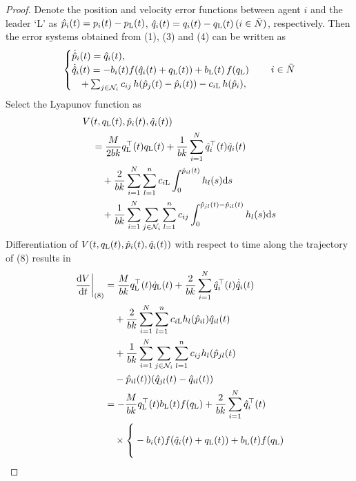 \documentclass{cta-author}
\begin{document}
\begin{proof}
Denote the position and velocity error functions
between agent $i$ and the leader `L' as
$\hat{p}_{i}(t)=p_{i}(t)-p_{\rm L}(t)$,
$\hat{q}_{i}(t)=q_{i}(t)-q_{\rm L}(t)\,(i\in\bar{N})$, respectively.
Then the error systems obtained from (1), (3) and (4) can be written as
\begin{align}
\begin{cases}
\dot{\hat{p}}_{i}(t)=\hat{q}_{i}(t),\\
\dot{\hat{q}}_{i}(t)=-b_{i}(t)f(\hat{q}_{i}(t)+q_{\rm L}(t))+b_{\rm L}(t)\,f(q_{\rm L})\\
\quad +\sum_{j\in\mathcal{N}_{i}}c_{ij}\,h(\hat{p}_{j}(t)-\hat{p}_{i}(t))-c_{i{\rm L}}\,h(\hat{p}_{i}),
\end{cases}\quad i\in\bar{N}\label{eq8}
\end{align}
Select the Lyapunov function as
\begin{align}
&V(t,q_{\rm L}(t),\hat{p}_{i}(t),\hat{q}_{i}(t))\notag\\
&\quad =\frac{M}{2bk}q^{\top}_{\rm L}(t)q_{\rm L}(t)+\frac{1}{bk}\sum_{i=1}^{N}\hat{q}^{\top}_{i}(t)\hat{q}_{i}(t)\nonumber\\
&\qquad +\frac{2}{bk}\sum_{i=1}^{N}\sum_{l=1}^{n}c_{i{\rm L}}\int^{\hat{p}_{il}(t)}_{0}h_{l}(s){\rm d}s\notag\\
&\qquad +\frac{1}{bk}\sum_{i=1}^{N}\sum_{j\in\mathcal{N}_{i}}
\sum_{l=1}^{n}c_{ij}\int^{\hat{p}_{jl}(t)-\hat{p}_{il}(t)}_{0}h_{l}(s){\rm d}s\nonumber
\end{align}
Differentiation of $V(t,q_{\rm L}(t),\hat{p}_{i}(t),\hat{q}_{i}(t))$ with respect to time along the trajectory
of (8) results in
\begin{align*}
\left.\frac{{\rm d} V}{{\rm d}t}\right|_{(8)} &=\frac{M}{bk}q^{\top}_{\rm L}(t)\dot{q}_{\rm L}(t)+\frac{2}{bk}\sum_{i=1}^{N}\hat{q}^{\top}_{i}(t)\dot{\hat{q}}_{i}(t)\\
&\quad +\frac{2}{bk}\sum_{i= 1}^{N}\sum_{l=1}^{n}c_{i{\rm L}}h_{l}(\hat{p}_{il})\hat{q}_{il}(t)\\
&\quad+\frac{1}{bk}\sum_{i=1}^{N}\sum_{j\in\mathcal{N}_{i}}\sum_{l=1}^{n}c_{ij}h_{l}(\hat{p}_{jl}(t)\\
&\quad-\hat{p}_{il}(t))(\hat{q}_{jl}(t)-\hat{q}_{il}(t))\\
&=-\frac{M}{bk}q_{\rm L}^{\top}(t)b_{\rm L}(t)f(q_{\rm L})+\frac{2}{bk}\sum_{i
=1}^{N}\hat{q}_{i}^{\top}(t)\\
&\quad\times \left\{\vphantom{\sum_{j\in\mathcal{N}_{i}}}-b_{i}(t)f(\hat{q}_{i}(t)+q_{\rm L}(t))+b_{\rm L}(t)f(q_{\rm L})\right.\\

\end{align*}
\end{proof}
\end{document}
